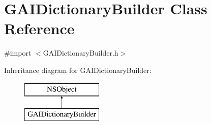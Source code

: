 \hypertarget{interface_g_a_i_dictionary_builder}{}\section{G\+A\+I\+Dictionary\+Builder Class Reference}
\label{interface_g_a_i_dictionary_builder}


{\ttfamily \#import $<$G\+A\+I\+Dictionary\+Builder.\+h$>$}

Inheritance diagram for G\+A\+I\+Dictionary\+Builder\+:\begin{figure}[H]
\begin{center}
\leavevmode
\includegraphics[height=2.000000cm]{interface_g_a_i_dictionary_builder}
\end{center}
\end{figure}
